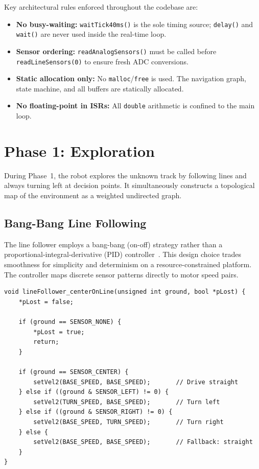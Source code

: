 \documentclass[runningheads]{llncs}
\begin{document}
Key architectural rules enforced throughout the codebase are:
\begin{itemize}
    \item \textbf{No busy-waiting:} \texttt{waitTick40ms()} is the sole timing source; \texttt{delay()} and \texttt{wait()} are never used inside the real-time loop.
    \item \textbf{Sensor ordering:} \texttt{readAnalogSensors()} must be called before \texttt{readLineSensors(0)} to ensure fresh ADC conversions.
    \item \textbf{Static allocation only:} No \texttt{malloc}/\texttt{free} is used. The navigation graph, state machine, and all buffers are statically allocated.
    \item \textbf{No floating-point in ISRs:} All \texttt{double} arithmetic is confined to the main loop.
\end{itemize}

\section{Phase 1: Exploration}\label{sec:phase1}

During Phase~1, the robot explores the unknown track by following lines and always turning left at decision points. It simultaneously constructs a topological map of the environment as a weighted undirected graph.

\subsection{Bang-Bang Line Following}

The line follower employs a bang-bang (on-off) strategy rather than a proportional-integral-derivative (PID) controller~\cite{pololupid}. This design choice trades smoothness for simplicity and determinism on a resource-constrained platform. The controller maps discrete sensor patterns directly to motor speed pairs.

\begin{lstlisting}[caption={Bang-bang line-following algorithm.},label={lst:bangbang}]
void lineFollower_centerOnLine(unsigned int ground, bool *pLost) {
    *pLost = false;

    if (ground == SENSOR_NONE) {
        *pLost = true;
        return;
    }

    if (ground == SENSOR_CENTER) {
        setVel2(BASE_SPEED, BASE_SPEED);       // Drive straight
    } else if ((ground & SENSOR_LEFT) != 0) {
        setVel2(TURN_SPEED, BASE_SPEED);       // Turn left
    } else if ((ground & SENSOR_RIGHT) != 0) {
        setVel2(BASE_SPEED, TURN_SPEED);       // Turn right
    } else {
        setVel2(BASE_SPEED, BASE_SPEED);       // Fallback: straight
    }
}
\end{lstlisting}
\end{document}
